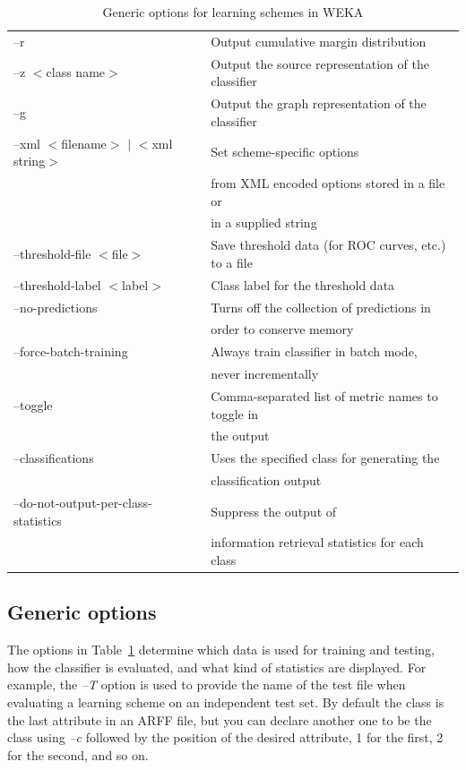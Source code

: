 \begin{table}[!thp]
{\begin{tabular}{ll}
--r & Output cumulative margin distribution \\
--z $<$class name$>$ &Output the source representation of the classifier \\
--g & Output the graph representation of the classifier \\
--xml $<$filename$>$ $|$ $<$xml string$>$ & Set scheme-specific options \\
& from XML encoded options stored in a file or \\ 
& in a supplied string \\
--threshold-file $<$file$>$ & Save threshold data (for ROC curves, etc.) to a file \\
--threshold-label $<$label$>$ & Class label for the threshold data \\
--no-predictions & Turns off the collection of predictions in \\
& order to conserve memory \\
--force-batch-training & Always train classifier in batch mode, \\
& never incrementally \\
--toggle & Comma-separated list of metric names to toggle in \\
&  the output\\
--classifications & Uses the specified class for generating the \\
& classification output \\
--do-not-output-per-class-statistics & Suppress the output of \\
& information retrieval statistics for each class \\
\hline
\end{tabular} \footnotesize \par}
\caption{\label{table:general_command_line_opts}Generic options for learning schemes in WEKA}
\end{table}

\subsection{Generic options}

The options in Table~\ref{table:general_command_line_opts} determine which
data is used for training and testing, how the classifier is
evaluated, and what kind of statistics are displayed. For example, the
\textit{--T} option is used to provide the name of the test file when evaluating
a learning scheme on an independent test set. By default the class is
the last attribute in an ARFF file, but you can declare another one to
be the class using \textit{--c} followed by the position of the
desired attribute, 1 for the first, 2 for the second, and so on.


